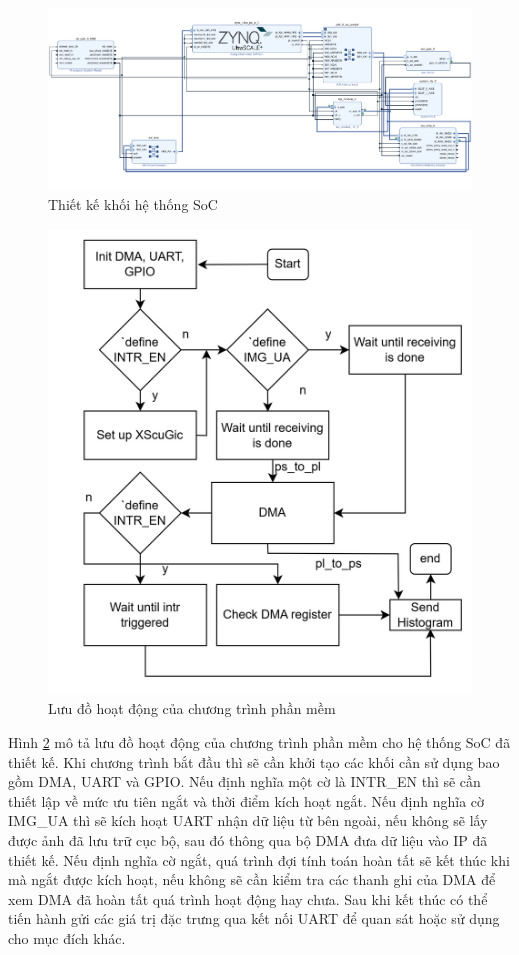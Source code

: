 \begin{figure}[!ht]
	\centering
	\includegraphics[width=\linewidth]{figures/socreal.png}
	\caption{Thiết kế khối hệ thống SoC}
	\label{fig:socreal}
\end{figure}
\begin{figure}[H]
	\centering
	\includegraphics[width=0.8\linewidth]{figures/socflow.png}
	\caption{Lưu đồ hoạt động của chương trình phần mềm}
	\label{fig:socflow}
\end{figure}
Hình \ref{fig:socflow} mô tả lưu đồ hoạt động của chương trình phần mềm cho hệ thống SoC đã thiết kế. Khi chương trình bắt đầu thì sẽ cần khởi tạo các khối cần sử dụng bao gồm DMA, UART và GPIO. Nếu định nghĩa một cờ là INTR\_EN thì sẽ cần thiết lập về mức ưu tiên ngắt và thời điểm kích hoạt ngắt. Nếu định nghĩa cờ IMG\_UA thì sẽ kích hoạt UART nhận dữ liệu từ bên ngoài, nếu không sẽ lấy được ảnh đã lưu trữ cục bộ, sau đó thông qua bộ DMA đưa dữ liệu vào IP đã thiết kế. Nếu định nghĩa cờ ngắt, quá trình đợi tính toán hoàn tất sẽ kết thúc khi mà ngắt được kích hoạt, nếu không sẽ cần kiểm tra các thanh ghi của DMA để xem DMA đã hoàn tất quá trình hoạt động hay chưa. Sau khi kết thúc có thể tiến hành gửi các giá trị đặc trưng qua kết nối UART để quan sát hoặc sử dụng cho mục đích khác.
